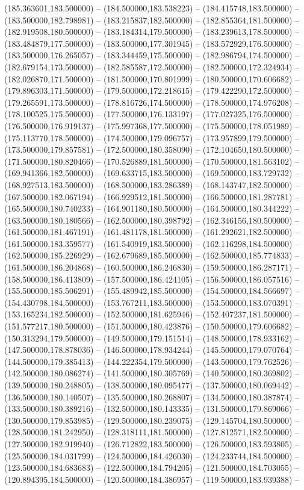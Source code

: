 (185.363601,183.500000) -- (184.500000,183.538223) -- (184.415748,183.500000) -- (183.500000,182.798981) -- (183.215837,182.500000) -- (182.855364,181.500000) -- (182.919508,180.500000) -- (183.184314,179.500000) -- (183.239613,178.500000) -- (183.484879,177.500000) -- (183.500000,177.301945) -- (183.572929,176.500000) -- (183.500000,176.265057) -- (183.344459,175.500000) -- (182.986794,174.500000) -- (182.679154,173.500000) -- (182.585587,172.500000) -- (182.500000,172.324934) -- (182.026870,171.500000) -- (181.500000,170.801999) -- (180.500000,170.606682) -- (179.896303,171.500000) -- (179.500000,172.218615) -- (179.422290,172.500000) -- (179.265591,173.500000) -- (178.816726,174.500000) -- (178.500000,174.976208) -- (178.100525,175.500000) -- (177.500000,176.133197) -- (177.027325,176.500000) -- (176.500000,176.919137) -- (175.997368,177.500000) -- (175.500000,178.051989) -- (175.113770,178.500000) -- (174.500000,179.096757) -- (173.957899,179.500000) -- (173.500000,179.857581) -- (172.500000,180.358090) -- (172.104650,180.500000) -- (171.500000,180.820466) -- (170.526889,181.500000) -- (170.500000,181.563102) -- (169.941366,182.500000) -- (169.633715,183.500000) -- (169.500000,183.729732) -- (168.927513,183.500000) -- (168.500000,183.286389) -- (168.143747,182.500000) -- (167.500000,182.067194) -- (166.929512,181.500000) -- (166.500000,181.287781) -- (165.500000,180.740233) -- (164.901180,180.500000) -- (164.500000,180.344222) -- (163.500000,180.180566) -- (162.500000,180.398792) -- (162.346156,180.500000) -- (161.500000,181.467191) -- (161.481178,181.500000) -- (161.292621,182.500000) -- (161.500000,183.359577) -- (161.540919,183.500000) -- (162.116298,184.500000) -- (162.500000,185.226929) -- (162.679689,185.500000) -- (162.500000,185.774833) -- (161.500000,186.204868) -- (160.500000,186.246830) -- (159.500000,186.287171) -- (158.500000,186.413809) -- (157.500000,186.424105) -- (156.500000,186.057516) -- (155.500000,185.506291) -- (155.489942,185.500000) -- (154.500000,184.566697) -- (154.430798,184.500000) -- (153.767211,183.500000) -- (153.500000,183.070391) -- (153.165234,182.500000) -- (152.500000,181.625946) -- (152.407237,181.500000) -- (151.577217,180.500000) -- (151.500000,180.423876) -- (150.500000,179.606682) -- (150.313294,179.500000) -- (149.500000,179.151514) -- (148.500000,178.933162) -- (147.500000,178.878036) -- (146.500000,178.934244) -- (145.500000,179.070764) -- (144.500000,179.385413) -- (144.222354,179.500000) -- (143.500000,179.762526) -- (142.500000,180.086274) -- (141.500000,180.305769) -- (140.500000,180.369802) -- (139.500000,180.248805) -- (138.500000,180.095477) -- (137.500000,180.069442) -- (136.500000,180.140507) -- (135.500000,180.268807) -- (134.500000,180.387874) -- (133.500000,180.389216) -- (132.500000,180.143335) -- (131.500000,179.869066) -- (130.500000,179.853985) -- (129.500000,180.239075) -- (129.145704,180.500000) -- (128.500000,181.242950) -- (128.318111,181.500000) -- (127.812571,182.500000) -- (127.500000,182.919940) -- (126.712822,183.500000) -- (126.500000,183.593805) -- (125.500000,184.031799) -- (124.500000,184.426030) -- (124.233744,184.500000) -- (123.500000,184.683683) -- (122.500000,184.794205) -- (121.500000,184.703055) -- (120.894395,184.500000) -- (120.500000,184.386957) -- (119.500000,183.939388) -- 
